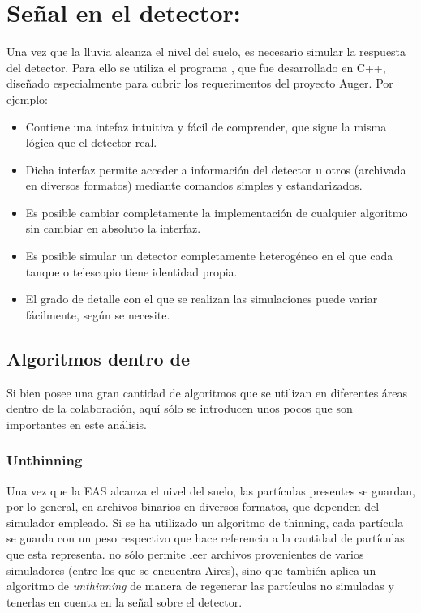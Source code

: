 	\section{Señal en el detector: \Offline{}}
	\label{sc:offline}
	
	Una vez que la lluvia alcanza el nivel del suelo, es necesario simular la respuesta del detector.
	Para ello se utiliza el programa \Offline{}, que fue desarrollado en C++, dise\~nado especialmente para cubrir los requerimentos del proyecto Auger. Por ejemplo:
	\begin{itemize}
	\item Contiene una intefaz intuitiva y f\'acil de comprender, que sigue la misma l\'ogica que el detector real.
	\item Dicha interfaz permite acceder a informaci\'on del detector u otros (archivada en diversos formatos) mediante comandos simples y estandarizados.
	\item Es posible cambiar completamente la implementaci\'on de cualquier algoritmo sin cambiar en absoluto la interfaz.
	\item Es posible simular un detector completamente heterog\'eneo en el que cada tanque o telescopio tiene identidad propia.
	\item El grado de detalle con el que se realizan las simulaciones puede variar f\'acilmente, seg\'un se necesite.
	\end{itemize}
	
	\subsection{Algoritmos dentro de \Offline{}}
	
	Si bien \Offline{} posee una gran cantidad de algoritmos que se utilizan en diferentes \'areas dentro de la colaboraci\'on, aqu\'i s\'olo se introducen unos pocos que son importantes en este an\'alisis.
	
		\subsubsection{Unthinning}
		
		Una vez que la EAS alcanza el nivel del suelo, las part\'iculas presentes se guardan, por lo general, en archivos binarios en diversos formatos, que dependen del simulador empleado.
		Si se ha utilizado un algoritmo de thinning, cada part\'icula se guarda con un peso respectivo que hace referencia a la cantidad de part\'iculas que esta representa.
		\Offline{} no s\'olo permite leer archivos provenientes de varios simuladores (entre los que se encuentra {\sc Aires}), sino que tambi\'en aplica un algoritmo de \textit{unthinning} de manera de regenerar las part\'iculas no simuladas y tenerlas en cuenta en la se\~nal sobre el detector.
		
